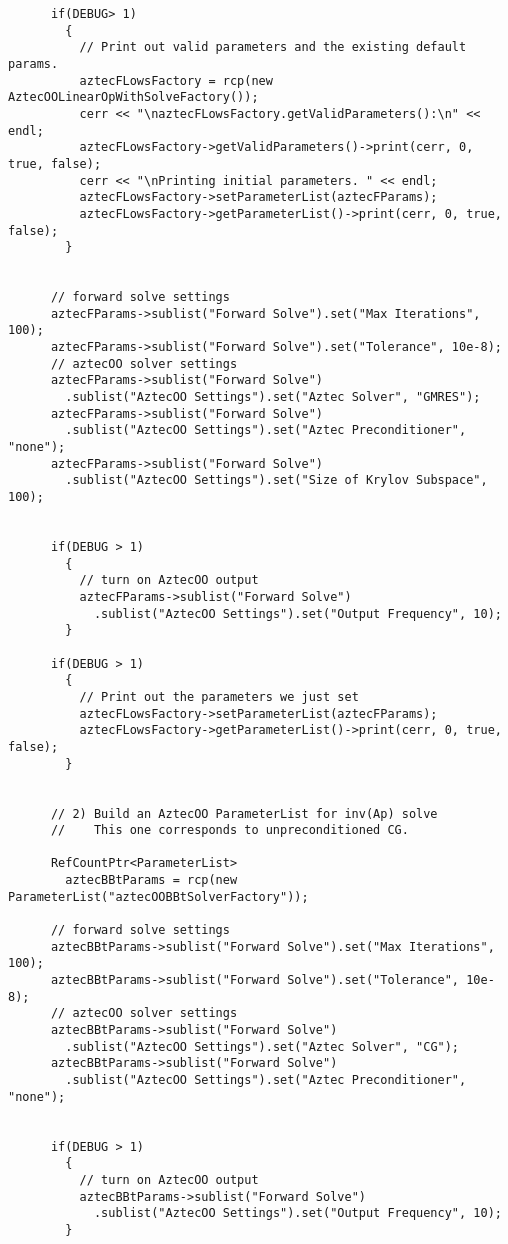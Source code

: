 \begin{verbatim}
      if(DEBUG> 1)
        {
          // Print out valid parameters and the existing default params.
          aztecFLowsFactory = rcp(new AztecOOLinearOpWithSolveFactory());
          cerr << "\naztecFLowsFactory.getValidParameters():\n" << endl;
          aztecFLowsFactory->getValidParameters()->print(cerr, 0, true, false);
          cerr << "\nPrinting initial parameters. " << endl;
          aztecFLowsFactory->setParameterList(aztecFParams);
          aztecFLowsFactory->getParameterList()->print(cerr, 0, true, false);
        }


      // forward solve settings
      aztecFParams->sublist("Forward Solve").set("Max Iterations", 100);
      aztecFParams->sublist("Forward Solve").set("Tolerance", 10e-8);
      // aztecOO solver settings
      aztecFParams->sublist("Forward Solve")
        .sublist("AztecOO Settings").set("Aztec Solver", "GMRES");
      aztecFParams->sublist("Forward Solve")
        .sublist("AztecOO Settings").set("Aztec Preconditioner", "none");
      aztecFParams->sublist("Forward Solve")
        .sublist("AztecOO Settings").set("Size of Krylov Subspace", 100);


      if(DEBUG > 1)
        {
          // turn on AztecOO output
          aztecFParams->sublist("Forward Solve")
            .sublist("AztecOO Settings").set("Output Frequency", 10);
        }

      if(DEBUG > 1)
        {
          // Print out the parameters we just set
          aztecFLowsFactory->setParameterList(aztecFParams);
          aztecFLowsFactory->getParameterList()->print(cerr, 0, true, false);
        }


      // 2) Build an AztecOO ParameterList for inv(Ap) solve
      //    This one corresponds to unpreconditioned CG.

      RefCountPtr<ParameterList>
        aztecBBtParams = rcp(new ParameterList("aztecOOBBtSolverFactory"));

      // forward solve settings
      aztecBBtParams->sublist("Forward Solve").set("Max Iterations", 100);
      aztecBBtParams->sublist("Forward Solve").set("Tolerance", 10e-8);
      // aztecOO solver settings
      aztecBBtParams->sublist("Forward Solve")
        .sublist("AztecOO Settings").set("Aztec Solver", "CG");
      aztecBBtParams->sublist("Forward Solve")
        .sublist("AztecOO Settings").set("Aztec Preconditioner", "none");


      if(DEBUG > 1)
        {
          // turn on AztecOO output
          aztecBBtParams->sublist("Forward Solve")
            .sublist("AztecOO Settings").set("Output Frequency", 10);
        }



\end{verbatim}
